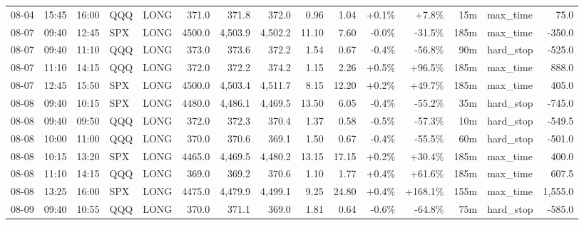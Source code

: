 \documentclass[11pt,a4paper,twoside]{article}
\begin{document}
\begin{landscape}
\begin{center}
\begin{longtable}{>{\color{txtmain}}l l l l l r r r r r r r r >{\color{txtmain}}l r}
08-04 & 15:45 & 16:00 & QQQ & LONG & 371.0 & 371.8 & 372.0 & 0.96 & 1.04 & \textcolor{wingreen}{+0.1\%} & \textcolor{wingreen}{+7.8\%} & 15m & max\_time & \textcolor{wingreen}{75.0} \\
08-07 & 09:40 & 12:45 & SPX & LONG & 4500.0 & 4,503.9 & 4,502.2 & 11.10 & 7.60 & \textcolor{lossred}{-0.0\%} & \textcolor{lossred}{-31.5\%} & 185m & max\_time & \textcolor{lossred}{-350.0} \\
08-07 & 09:40 & 11:10 & QQQ & LONG & 373.0 & 373.6 & 372.2 & 1.54 & 0.67 & \textcolor{lossred}{-0.4\%} & \textcolor{lossred}{-56.8\%} & 90m & hard\_stop & \textcolor{lossred}{-525.0} \\
08-07 & 11:10 & 14:15 & QQQ & LONG & 372.0 & 372.2 & 374.2 & 1.15 & 2.26 & \textcolor{wingreen}{+0.5\%} & \textcolor{wingreen}{+96.5\%} & 185m & max\_time & \textcolor{wingreen}{888.0} \\
08-07 & 12:45 & 15:50 & SPX & LONG & 4500.0 & 4,503.4 & 4,511.7 & 8.15 & 12.20 & \textcolor{wingreen}{+0.2\%} & \textcolor{wingreen}{+49.7\%} & 185m & max\_time & \textcolor{wingreen}{405.0} \\
08-08 & 09:40 & 10:15 & SPX & LONG & 4480.0 & 4,486.1 & 4,469.5 & 13.50 & 6.05 & \textcolor{lossred}{-0.4\%} & \textcolor{lossred}{-55.2\%} & 35m & hard\_stop & \textcolor{lossred}{-745.0} \\
08-08 & 09:40 & 09:50 & QQQ & LONG & 372.0 & 372.3 & 370.4 & 1.37 & 0.58 & \textcolor{lossred}{-0.5\%} & \textcolor{lossred}{-57.3\%} & 10m & hard\_stop & \textcolor{lossred}{-549.5} \\
08-08 & 10:00 & 11:00 & QQQ & LONG & 370.0 & 370.6 & 369.1 & 1.50 & 0.67 & \textcolor{lossred}{-0.4\%} & \textcolor{lossred}{-55.5\%} & 60m & hard\_stop & \textcolor{lossred}{-501.0} \\
08-08 & 10:15 & 13:20 & SPX & LONG & 4465.0 & 4,469.5 & 4,480.2 & 13.15 & 17.15 & \textcolor{wingreen}{+0.2\%} & \textcolor{wingreen}{+30.4\%} & 185m & max\_time & \textcolor{wingreen}{400.0} \\
08-08 & 11:10 & 14:15 & QQQ & LONG & 369.0 & 369.2 & 370.6 & 1.10 & 1.77 & \textcolor{wingreen}{+0.4\%} & \textcolor{wingreen}{+61.6\%} & 185m & max\_time & \textcolor{wingreen}{607.5} \\
08-08 & 13:25 & 16:00 & SPX & LONG & 4475.0 & 4,479.9 & 4,499.1 & 9.25 & 24.80 & \textcolor{wingreen}{+0.4\%} & \textcolor{wingreen}{+168.1\%} & 155m & max\_time & \textcolor{wingreen}{1,555.0} \\
08-09 & 09:40 & 10:55 & QQQ & LONG & 370.0 & 371.1 & 369.0 & 1.81 & 0.64 & \textcolor{lossred}{-0.6\%} & \textcolor{lossred}{-64.8\%} & 75m & hard\_stop & \textcolor{lossred}{-585.0} \\

\end{longtable}
\end{center}
\end{landscape}
\end{document}
